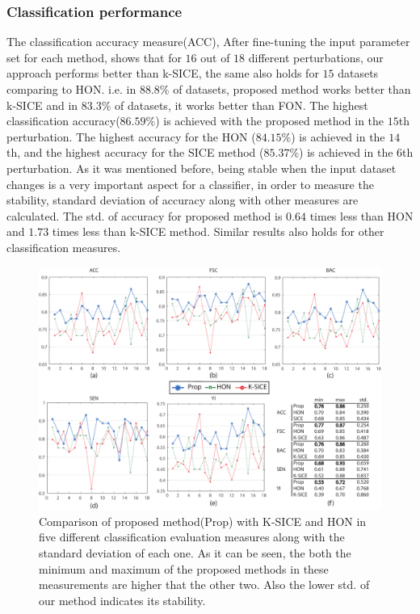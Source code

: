 \documentclass[preprint,12pt]{elsarticle}
\begin{document}
\subsubsection{Classification performance}
The classification accuracy measure(ACC), After fine-tuning the input parameter set for each method, shows that for $16$ out of $18$ different perturbations, our approach performs better than k-SICE, the same also holds for $15$ datasets comparing to HON. i.e. in $88.8 \%$ of datasets, proposed method works better than k-SICE and in $83.3 \%$ of datasets, it works better than FON.  
The highest classification accuracy($86.59\%$) is achieved with the proposed method in the $15$th perturbation. The highest accuracy for the HON ($84.15\%$) is achieved in the $14$th, and the highest accuracy for the SICE method ($85.37\%$) is achieved in the $6$th perturbation. As it was mentioned before, being stable when the input dataset changes is a very important aspect for a classifier, in order to measure the stability, standard deviation of accuracy along with other measures are
calculated. The std. of accuracy for proposed method is $0.64$ times less than HON and $1.73$ times less than k-SICE method. Similar results also holds for other classification measures.
\begin{figure}
	\centering
	\includegraphics[width=7in]{images/Final-eps.pdf}
	\caption{
		Comparison of proposed method(Prop) with K-SICE and HON in five different classification evaluation measures along with the standard deviation of each one. As it can be seen, the both the minimum and maximum of the proposed methods in these measurements are higher that the other two. Also the lower std. of our method indicates its stability.   
	}
	\label{g3.2}
\end{figure}
\end{document}
